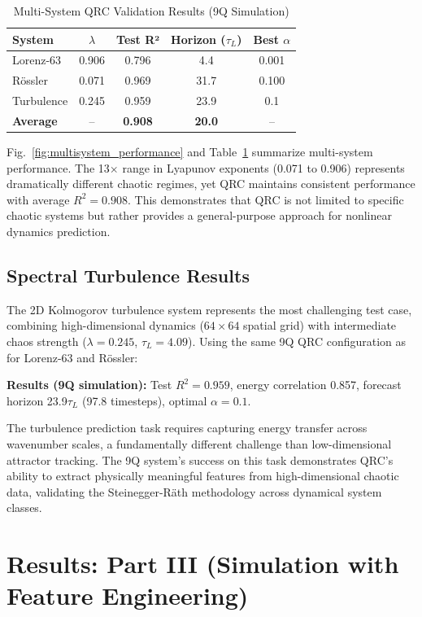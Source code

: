 \documentclass[conference]{IEEEtran}
\begin{document}
\begin{table}[!htbp]
\centering
\caption{Multi-System QRC Validation Results (9Q Simulation)}
\label{tab:multisystem_results}
\begin{tabular}{@{}lcccc@{}}
\toprule
\textbf{System} & \textbf{$\lambda$} & \textbf{Test R²} & \textbf{Horizon ($\tau_L$)} & \textbf{Best $\alpha$} \\
\midrule
Lorenz-63 & 0.906 & 0.796 & 4.4 & 0.001 \\
Rössler & 0.071 & 0.969 & 31.7 & 0.100 \\
Turbulence & 0.245 & 0.959 & 23.9 & 0.1 \\
\midrule
\textbf{Average} & -- & \textbf{0.908} & \textbf{20.0} & -- \\
\bottomrule
\end{tabular}
\end{table}

Fig.~\ref{fig:multisystem_performance} and Table~\ref{tab:multisystem_results} summarize multi-system performance. The 13$\times$ range in Lyapunov exponents (0.071 to 0.906) represents dramatically different chaotic regimes, yet QRC maintains consistent performance with average $R^2=0.908$. This demonstrates that QRC is not limited to specific chaotic systems but rather provides a general-purpose approach for nonlinear dynamics prediction.

\subsection{Spectral Turbulence Results}

The 2D Kolmogorov turbulence system represents the most challenging test case, combining high-dimensional dynamics ($64 \times 64$ spatial grid) with intermediate chaos strength ($\lambda=0.245$, $\tau_L=4.09$). Using the same 9Q QRC configuration as for Lorenz-63 and Rössler:

\textbf{Results (9Q simulation):} Test $R^2 = 0.959$, energy correlation 0.857, forecast horizon 23.9$\tau_L$ (97.8 timesteps), optimal $\alpha=0.1$.

The turbulence prediction task requires capturing energy transfer across wavenumber scales, a fundamentally different challenge than low-dimensional attractor tracking. The 9Q system's success on this task demonstrates QRC's ability to extract physically meaningful features from high-dimensional chaotic data, validating the Steinegger-Räth methodology across dynamical system classes.

\section{Results: Part III (Simulation with Feature Engineering)}
\label{sec:simulation_results}
\end{document}
